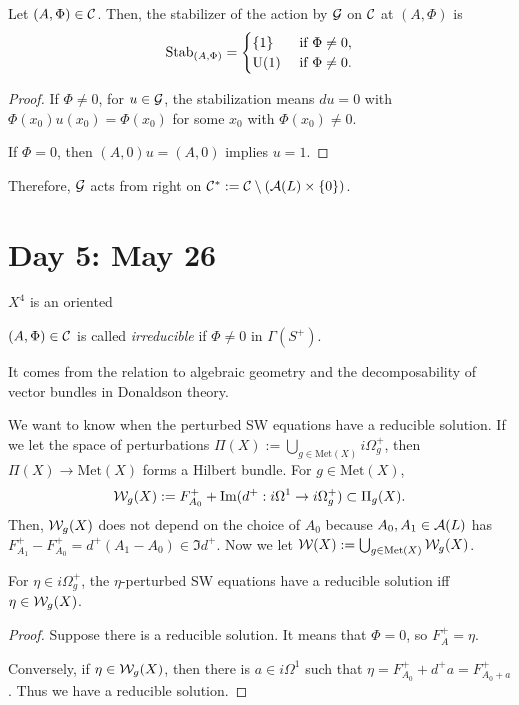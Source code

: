 \documentclass{../../../small}
\begin{document}
\begin{lemma}
Let $(A,\Phi)\in\mathcal{C}$.
Then, the stabilizer of the action by $\mathcal{G}$ on $\mathcal{C}$ at $(A,\Phi)$ is
\[\mathrm{Stab}_{(A,\Phi)}=\begin{cases}
\{1\}&\text{ if }\Phi\ne0,\\
\mathrm{U}(1)&\text{ if }\Phi\ne0.
\end{cases}\]
\end{lemma}
\begin{proof}
If $\Phi\ne0$, for $u\in\mathcal{G}$, the stabilization means $du=0$ with $\Phi(x_0)u(x_0)=\Phi(x_0)$ for some $x_0$ with $\Phi(x_0)\ne0$.

If $\Phi=0$, then $(A,0)u=(A,0)$ implies $u=1$.
\end{proof}
Therefore, $\mathcal{G}$ acts from right on $\mathcal{C}^*:=\mathcal{C}\setminus(\mathcal{A}(L)\times\{0\})$.



\newpage
\section{Day 5: May 26}

$X^4$ is an oriented

\begin{definition*}
$(A,\Phi)\in\mathcal{C}$ is called \emph{irreducible} if $\Phi\ne0$ in $\Gamma(S^+)$.
\end{definition*}

It comes from the relation to algebraic geometry and the decomposability of vector bundles in Donaldson theory.

We want to know when the perturbed SW equations have a reducible solution.
If we let the space of perturbations $\Pi(X):=\bigcup_{g\in\mathrm{Met}(X)}i\Omega_g^+$, then $\Pi(X)\to\mathrm{Met}(X)$ forms a Hilbert bundle.
For $g\in\mathrm{Met}(X)$,
\[\mathcal{W}_g(X):=F_{A_0}^++\operatorname{Im}(d^+:i\Omega^1\to i\Omega_g^+)\subset\Pi_g(X).\]
Then, $\mathcal{W}_g(X)$ does not depend on the choice of $A_0$ because $A_0,A_1\in\mathcal{A}(L)$ has $F_{A_1}^+-F_{A_0}^+=d^+(A_1-A_0)\in\Im d^+$.
Now we let $\mathcal{W}(X):=\bigcup_{g\in\mathrm{Met}(X)}\mathcal{W}_g(X)$.

\begin{lemma*}
For $\eta\in i\Omega_g^+$, the $\eta$-perturbed SW equations have a reducible solution iff $\eta\in\mathcal{W}_g(X)$.
\end{lemma*}
\begin{proof}
Suppose there is a reducible solution.
It means that $\Phi=0$, so $F_A^+=\eta$.

Conversely, if $\eta\in\mathcal{W}_g(X)$, then there is $a\in i\Omega^1$ such that $\eta=F_{A_0}^++d^+a=F_{A_0+a}^+$.
Thus we have a reducible solution.
\end{proof}
\end{document}
